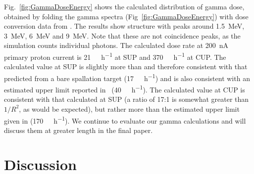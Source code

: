 \documentclass[peerreviewca,11pt,a4paper]{IEEEtran}
\begin{document}
Fig.~\ref{fig:GammaDoseEnergy} shows the calculated distribution of gamma dose, obtained by folding the gamma spectra (Fig~\ref{fig:GammaDoseEnergy}) with dose conversion data from \cite{Kwon1980}.
The results show structure with peaks around \SI{1.5}{\MeV}, \SI{3}{\MeV}, \SI{6}{\MeV} and \SI{9}{\MeV}.
Note that these are not coincidence peaks, as the simulation counts individual photons.
The calculated dose rate at \SI{200}{\nA} primary proton current is \SI{21}{\milli\seivert\per\hour} at SUP and \SI{370}{\milli\seivert\per\hour} at CUP.
The calculated value at SUP is slightly more than and therefore consistent with that predicted from a bare spallation target (\SI{17}{\milli\seivert\per\hour}) and is also consistent with an estimated upper limit reported in~\cite{Prokofiev2009} (\SI{40}{\milli\seivert\per\hour}).
The calculated value at CUP is consistent with that calculated at SUP (a ratio of 17:1 is somewhat greater than $1/R^2$, as would be expected), but rather more than the estimated upper limit given in \cite{Prokofiev2014} (\SI{170}{\milli\seivert\per\hour}).
We continue to evaluate our gamma calculations and will discuss them at greater length in the final paper.

\section{Discussion}
\end{document}

